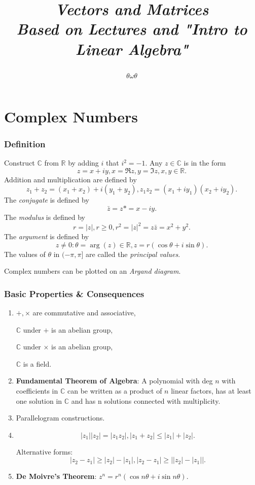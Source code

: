 \documentclass[10pt]{article}
\title{\begin{center}{\Huge \textit{Vectors and Matrices}}\\{{\itshape Based on Lectures and "Intro to Linear Algebra"}}\end{center}}
\author{$\theta\omega\theta$}
\affiliation{
Not in University of Cambridge\\
skipped some talks irrelevant to contents\\
}
\def\le{\leqslant}
\def\ge{\geqslant}
\begin{document}
	\maketitle
	\flushbottom
	\newpage
	\pagestyle{fancynotes}
	\part{Complex Numbers}
    \section{Definition}
    \begin{definition}
        Construct $\mathbb{C} $ from $ \mathbb{R}  $ by adding $i$ that $i^2 = -1$. Any $z\in \mathbb{C}$ is in the form
        \[
            z = x+iy, x = \Re z, y= \Im z, x,y\in \mathbb{R} . 
        \] 
        Addition and multiplication are defined by
        \[
            z_1+z_2 = (x_1+x_2) + i(y_1+y_2), z_1z_2 = (x_1+iy_1)(x_2+iy_2)
        .\]
        The \textit{conjugate} is defined by
        \[
            \bar{z} = z* = x-iy
        .\]
        The \textit{modulus} is defined by
        \[
            r = |z|, r\ge 0, r^2=|z|^2=z\bar{z}=x^2+y^2
        .\]
        The \textit{argument} is defined by
        \[
            z\neq 0: \theta=\arg(z)\in \mathbb{R}, z=r(\cos \theta+i\sin \theta)
        .\]
        The values of $ \theta $ in $ (-\pi, \pi] $ are called the \textit{principal values}.

        Complex numbers can be plotted on an \textit{Argand diagram}.
    \end{definition}
    \section{Basic Properties \& Consequences}
    \begin{enumerate}[(1)]
        \item $ +, \times $ are commutative and associative,
        
            $ \mathbb{C} $ under $+$ is an abelian group,
            
            $ \mathbb{C} $ under $\times$ is an abelian group,

            $ \mathbb{C} $ is a field.
        \item \textbf{Fundamental Theorem of Algebra}: A polynomial with deg $n$ with coefficients in $ \mathbb{C}  $ can be written as a product of $n$ linear factors, has at least one solution in $ \mathbb{C}  $ and has n solutions connected with multiplicity.
        \item Parallelogram constructions.
        \item \[
            \left| z_1 \right| \left| z_2 \right| = \left| z_1z_2 \right|, \left| z_1+z_2 \right| \le \left| z_1 \right| +\left| z_2 \right|
        .\]

        Alternative forms:
        \[
            \left| z_2-z_1 \right| \ge \left| z_2 \right| -\left| z_1 \right|, \left| z_2-z_1 \right| \ge \left| |z_2|-|z_1| \right| 
        .\]
        \item \textbf{De Moivre's Theorem}: $ z^n = r^n(\cos n\theta+i\sin n\theta) $.
    \end{enumerate}
\end{document}

